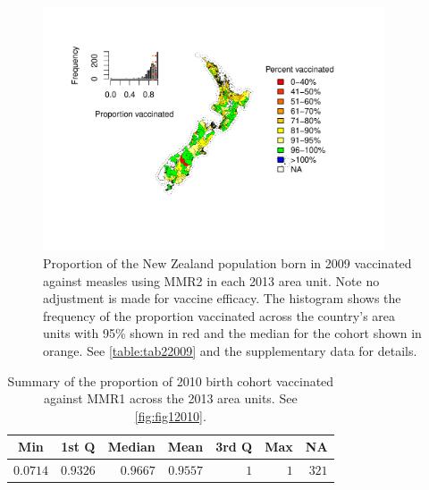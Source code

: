 \documentclass{article}
\begin{document}
\begin{figure}
\begin{center}
    \includegraphics[width=0.9\textwidth]{nir_census_MMR2_NIR_2009.pdf}
 \end{center}
    \caption{Proportion of the New Zealand population born in 2009 vaccinated against measles using MMR2 in each 2013 area unit. Note no adjustment is made for vaccine efficacy. The histogram shows the frequency of the proportion vaccinated across the country's area units with 95\% shown in red and the median for the cohort shown in orange. See \autoref{table:tab22009} and the supplementary data for details.}
\label{fig:fig22009}
\end{figure}

 \vspace{5mm} %
\begin{table}
\begin{center}
\begin{tabular}{rrrrrrr}
\hline\hline
\multicolumn{1}{c}{Min}&\multicolumn{1}{c}{1st Q}&\multicolumn{1}{c}{Median}&\multicolumn{1}{c}{Mean}&\multicolumn{1}{c}{3rd Q}&\multicolumn{1}{c}{Max}&\multicolumn{1}{c}{NA}\tabularnewline
\hline
$0.0714$&$0.9326$&$0.9667$&$0.9557$&$1$&$1$&$321$\tabularnewline
\hline
\end{tabular}\end{center}\caption{Summary of the proportion of 2010 birth cohort vaccinated against MMR1 across the 2013 area units. See \autoref{fig:fig12010}.}
\label{table:tab12010}
\end{table}
\end{document}
